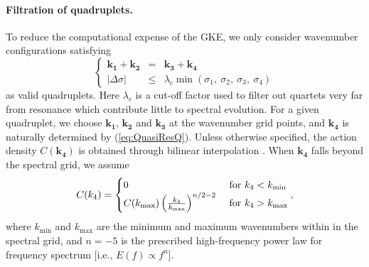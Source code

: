 \paragraph{Filtration of quadruplets.} To reduce the computational expense
of the GKE, we only consider wavenumber configurations satisfying
%
\begin{equation}
\left \lbrace
\begin{array}{rcl}
\boldsymbol{k_1} + \boldsymbol{k_2} &=& \boldsymbol{k_3} + \boldsymbol{k_4}\\
|\Delta \sigma| & \leq &\lambda_c \min (\sigma_1,\ \sigma_2,\ \sigma_3,\ \sigma_4)
\end{array}
\right.
\label{eq:QuasiResQ}
\end{equation}
%
as valid quadruplets. Here $\lambda_c$ is a cut-off factor used to filter
out quartets very far from resonance which contribute little to spectral
evolution.
For a given quadruplet, we choose $\boldsymbol{k_1}$, $\boldsymbol{k_2}$
and $\boldsymbol{k_3}$ at the wavenumber grid points, and $\boldsymbol{k_4}$
is naturally determined by (\ref{eq:QuasiResQ}). Unless otherwise specified,
the action density $C(\boldsymbol{k_4})$ is obtained through bilinear
interpolation \citep{vanVledder2006}. When $\boldsymbol{k_4}$ falls beyond
the spectral grid, we assume
\begin{equation}
C(k_4) =
\begin{cases}
0 & \textnormal{ for } k_4 < k_{\min}\\
C(k_{\max}) \left( \frac{k_4}{k_{\max}} \right)^{n/2 - 2} & \text{ for } k_4 > k_{\max}\\
\end{cases},
\label{eq:GBound}
\end{equation}
where $k_{\min}$ and $k_{\max}$ are the minimum and maximum wavenumbers
within in the spectral grid, and $n=-5$ is the prescribed high-frequency
power law for frequency spectrum [i.e., $E(f) \propto f^{n}$].

